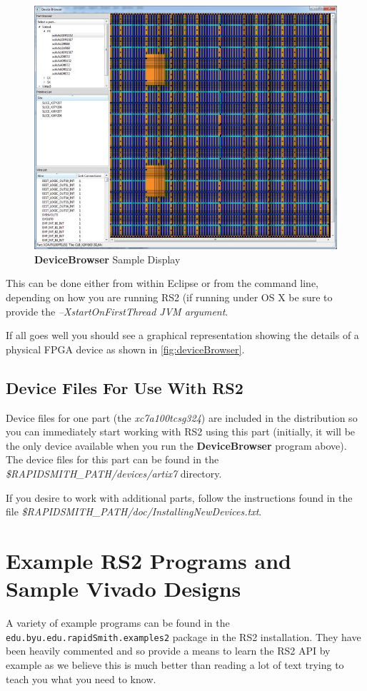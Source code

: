 \documentclass[12pt]{article}
\newcommand{\fil}[1]{{\em #1}}
\newcommand{\pkg}[1]{{\texttt{#1}}}
\newcommand{\opt}[1]{{\em #1}}
\newcommand{\pgm}[1]{{\textbf{#1}}}
\newcommand{\dir}[1]{{\em #1}}
\begin{document}
\begin{figure}[htb]
\centering
\includegraphics[width=0.8\columnwidth]{deviceBrowser}
\caption{\pgm{DeviceBrowser} Sample Display}
\label{fig:deviceBrowser}
\end{figure}

This can be done either from within Eclipse or from the command line, depending
on how you are running RS2 (if running under OS X be sure to provide the
\opt{–XstartOnFirstThread JVM argument}.

If all goes well you should see a graphical representation showing the details
of a physical FPGA device as shown in \autoref{fig:deviceBrowser}.

\subsection{Device Files For Use With RS2}
Device files for one part (the {\em xc7a100tcsg324}) are included in the
distribution so you can immediately start working with RS2 using this part (initially, it
will be the only device available when you run the \pgm{DeviceBrowser} program
above).  The device files for this part can be found in the
\dir{\${RAPIDSMITH\_PATH}/devices/artix7} directory.               

If you desire to work with additional parts, follow the instructions found in the
file \fil{\$RAPIDSMITH\_PATH/doc/InstallingNewDevices.txt}.

\section{Example RS2 Programs and Sample Vivado Designs}

A variety of example programs can be found in the
\pkg{edu.byu.edu.rapidSmith.examples2} package in the RS2 installation.
They have been heavily commented and so provide a means to learn the RS2 API by
example as we believe this is much better than reading a lot of text trying to
teach you what you need to know.
\end{document}
